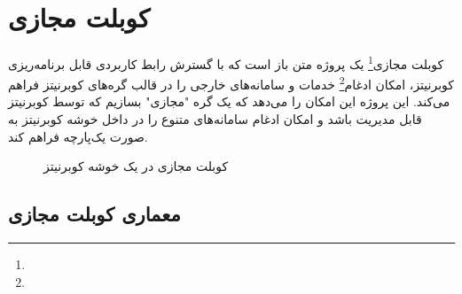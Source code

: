 \section{کوبلت مجازی}
\label{sec:vritkubelet}
\paragraph{}
{
    کوبلت مجازی\footnote{} یک پروژه متن باز است که با گسترش رابط‌ کاربردی قابل برنامه‌ریزی کوبرنیتز، امکان ادغام\footnote{} خدمات و سامانه‌های خارجی را در قالب گره‌های کوبرنیتز فراهم می‌کند. این پروژه این امکان را می‌دهد که یک گره "مجازی" بسازیم که توسط کوبرنیتز قابل مدیریت باشد و امکان ادغام سامانه‌های متنوع را در داخل خوشه کوبرنیتز به صورت یک‌پارچه فراهم کند.    
    \begin{figure}[H]
     \caption{کوبلت مجازی در یک خوشه کوبرنیتز}
     \label{fig:virtkublet_arch}
    \end{figure}
}

\subsection{معماری کوبلت مجازی}
\label{subsec:vkube_arch}
